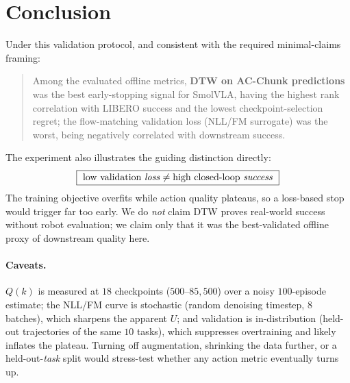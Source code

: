 \documentclass[11pt]{article}
\begin{document}
\section{Conclusion}

Under this validation protocol, and consistent with the required minimal-claims framing:
\begin{quote}
Among the evaluated offline metrics, \textbf{DTW on AC-Chunk predictions} was the best early-stopping
signal for SmolVLA, having the highest rank correlation with LIBERO success and the lowest
checkpoint-selection regret; the flow-matching validation loss (NLL/FM surrogate) was the worst,
being negatively correlated with downstream success.
\end{quote}
The experiment also illustrates the guiding distinction directly:
\begin{equation}
  \boxed{\ \text{low validation \emph{loss}} \neq \text{high closed-loop \emph{success}}\ }
\end{equation}
The training objective overfits while action quality plateaus, so a loss-based stop would trigger far
too early. We do \emph{not} claim DTW proves real-world success without robot evaluation; we claim
only that it was the best-validated offline proxy of downstream quality here.

\paragraph{Caveats.} $Q(k)$ is measured at $18$ checkpoints ($500$--$85{,}500$) over a noisy $100$-episode
estimate; the NLL/FM curve is stochastic (random denoising timestep, $8$ batches), which sharpens the
apparent $U$; and validation is in-distribution (held-out trajectories of the same $10$ tasks), which
suppresses overtraining and likely inflates the plateau. Turning off augmentation, shrinking the data
further, or a held-out-\emph{task} split would stress-test whether any action metric eventually
turns up.
\end{document}
